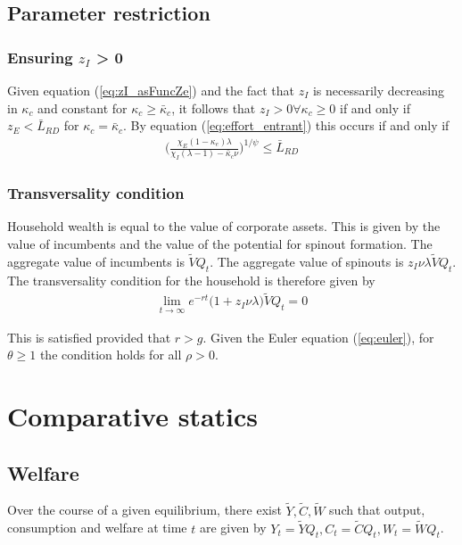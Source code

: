 \documentclass[12pt,english]{article}
\theoremstyle{remark}
\begin{document}
\subsection{Parameter restriction}

\subsubsection{Ensuring $z_I$ > 0}
Given equation (\ref{eq:zI_asFuncZe}) and the fact that $z_I$ is necessarily decreasing in $\kappa_c$ and constant for $\kappa_c \ge \bar{\kappa}_c$, it follows that $z_I > 0 \forall \kappa_c \ge 0$ if and only if $z_E < \bar{L}_{RD}$ for $\kappa_c = \bar{\kappa}_c$. By equation (\ref{eq:effort_entrant}) this occurs if and only if
\begin{align}
	\Big( \frac{\chi_E (1-\kappa_{e}) \lambda}{\chi_I(\lambda-1) - \bar{\kappa}_c \nu } \Big)^{1/\psi} \le \bar{L}_{RD}
\end{align}

\subsubsection{Transversality condition}

Household wealth is equal to the value of corporate assets. This is given by the value of incumbents and the value of the potential for spinout formation. The aggregate value of incumbents is $\tilde{V}Q_t$. The aggregate value of spinouts is $z_I \nu \lambda \tilde{V} Q_t$. The transversality condition for the household is therefore given by 
\begin{align}
	\lim_{t \to \infty} e^{-rt} \big(1 + z_I \nu \lambda \big)\tilde{V} Q_t = 0
\end{align}

This is satisfied provided that $r > g$. Given the Euler equation (\ref{eq:euler}), for $\theta \ge 1$ the condition holds for all $\rho > 0$. 

\section{Comparative statics}

\subsection{Welfare}

Over the course of a given equilibrium, there exist $\tilde{Y},\tilde{C},\tilde{W}$ such that output, consumption and welfare at time $t$ are given by $Y_t = \tilde{Y} Q_t, C_t = \tilde{C} Q_t, W_t = \tilde{W} Q_t$. 
\end{document}
